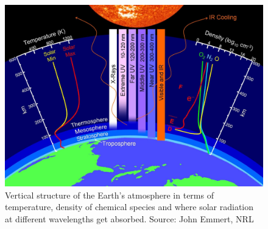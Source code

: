 \begin{figure}[t]
	\centering\includegraphics[width=32pc]{vert_stu.jpg}
	\caption{Vertical structure of the Earth's atmosphere in terms of temperature, density of chemical species and where solar radiation at different wavelengths get absorbed. Source: John Emmert, NRL}
	\label{fig:vert_str}
\end{figure}



